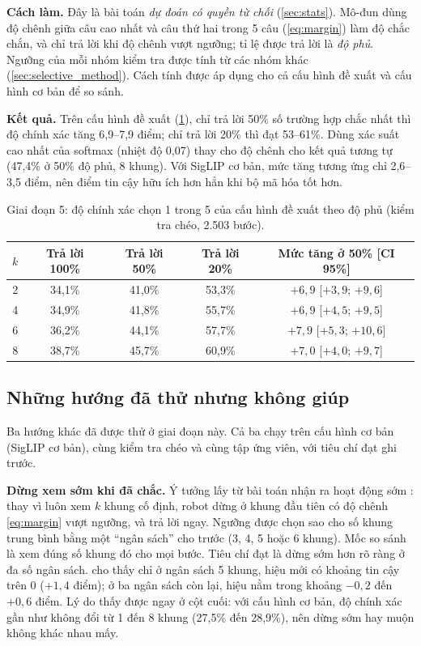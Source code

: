 \documentclass[a4paper,oneside]{report}
\begin{document}
\textbf{Cách làm.} Đây là bài toán \textit{dự đoán có quyền từ chối} (\cref{sec:stats}). Mô-đun dùng độ chênh giữa câu cao nhất và câu thứ hai trong 5 câu (\cref{eq:margin}) làm độ chắc chắn, và chỉ trả lời khi độ chênh vượt ngưỡng; tỉ lệ được trả lời là \textit{độ phủ}. Ngưỡng của mỗi nhóm kiểm tra được tính từ các nhóm khác (\cref{sec:selective_method}). Cách tính được áp dụng cho cả cấu hình đề xuất và cấu hình cơ bản để so sánh.

\textbf{Kết quả.} Trên cấu hình đề xuất (\cref{tab:selective}), chỉ trả lời 50\% số trường hợp chắc nhất thì độ chính xác tăng 6,9--7,9 điểm; chỉ trả lời 20\% thì đạt 53--61\%. Dùng xác suất cao nhất của softmax (nhiệt độ 0,07) thay cho độ chênh cho kết quả tương tự (47,4\% ở 50\% độ phủ, 8 khung). Với SigLIP cơ bản, mức tăng tương ứng chỉ 2,6--3,5 điểm, nên điểm tin cậy hữu ích hơn hẳn khi bộ mã hóa tốt hơn.

\begin{table}[ht]
\centering
\caption{Giai đoạn 5: độ chính xác chọn 1 trong 5 của cấu hình đề xuất theo độ phủ (kiểm tra chéo, 2.503 bước).}
\label{tab:selective}
\small
\begin{tabular}{ccccc}
\toprule
$k$ & Trả lời 100\% & Trả lời 50\% & Trả lời 20\% & Mức tăng ở 50\% [CI 95\%] \\
\midrule
2 & 34,1\% & 41,0\% & 53,3\% & $+6{,}9$ [$+3{,}9$; $+9{,}6$] \\
4 & 34,9\% & 41,8\% & 55,7\% & $+6{,}9$ [$+4{,}5$; $+9{,}5$] \\
6 & 36,2\% & 44,1\% & 57,7\% & $+7{,}9$ [$+5{,}3$; $+10{,}6$] \\
8 & 38,7\% & 45,7\% & 60,9\% & $+7{,}0$ [$+4{,}0$; $+9{,}7$] \\
\bottomrule
\end{tabular}
\end{table}

\subsection{Những hướng đã thử nhưng không giúp}

Ba hướng khác đã được thử ở giai đoạn này. Cả ba chạy trên cấu hình cơ bản (SigLIP cơ bản), cùng kiểm tra chéo và cùng tập ứng viên, với tiêu chí đạt ghi trước.

\textbf{Dừng xem sớm khi đã chắc.} Ý tưởng lấy từ bài toán nhận ra hoạt động sớm \citep{ryoo2011early}: thay vì luôn xem $k$ khung cố định, robot dừng ở khung đầu tiên có độ chênh \cref{eq:margin} vượt ngưỡng, và trả lời ngay. Ngưỡng được chọn sao cho số khung trung bình bằng một ``ngân sách'' cho trước (3, 4, 5 hoặc 6 khung). Mốc so sánh là xem đúng số khung đó cho mọi bước. Tiêu chí đạt là dừng sớm hơn rõ ràng ở đa số ngân sách.  cho thấy chỉ ở ngân sách 5 khung, hiệu mới có khoảng tin cậy trên 0 ($+1{,}4$ điểm); ở ba ngân sách còn lại, hiệu nằm trong khoảng $-0{,}2$ đến $+0{,}6$ điểm. Lý do thấy được ngay ở cột cuối: với cấu hình cơ bản, độ chính xác gần như không đổi từ 1 đến 8 khung (27,5\% đến 28,9\%), nên dừng sớm hay muộn không khác nhau mấy.
\end{document}
